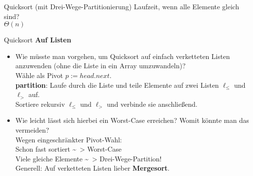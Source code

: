 

\begin{frame}{Quicksort (mit Drei-Wege-Partitionierung)}
	Laufzeit, wenn alle Elemente gleich sind? \\
	\pause
	\impl $\Theta(n)$
\end{frame}

\begin{frame}{Quicksort}
	\textbf{Auf Listen} \\
	\begin{itemize}
		\item Wie müsste man vorgehen, um Quicksort auf einfach verketteten Listen anzuwenden (ohne die Liste in ein Array umzuwandeln)? \\ 
		\pause
		\impl Wähle als Pivot $p := head.next$. \\ 
		\textbf{partition}: Laufe durch die Liste und teile Elemente auf zwei Listen $\ell_\leq$ und $\ell_>$ auf. \\
		Sortiere rekursiv $\ell_\leq$ und $\ell_>$ und verbinde sie anschließend.
		\item Wie leicht lässt sich hierbei ein Worst-Case erreichen? Womit könnte man das vermeiden? \\
		\pause
		\impl Wegen eingeschränkter Pivot-Wahl: \\
		Schon fast sortiert \~~> Worst-Case \\
		\impl Viele gleiche Elemente \~~> Drei-Wege-Partition! \\
		\impl Generell: Auf verketteten Listen lieber \textbf{Mergesort}.
	\end{itemize}
\end{frame}

